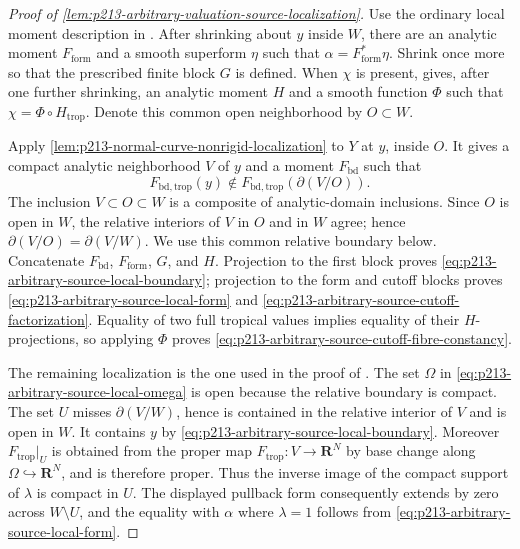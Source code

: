 
\begin{proof}[Proof of
\cref{lem:p213-arbitrary-valuation-source-localization}]
Use the ordinary local moment description in
\cite[Proposition~15.1.1(b)]{CLD25}.  After shrinking about $y$ inside
$W$,
there are an analytic moment $F_{\mathrm{form}}$ and a smooth superform
$\eta$ such that $\alpha=F_{\mathrm{form}}^*\eta$.  Shrink once more so
that the prescribed finite block $G$ is defined.  When $\chi$ is present,
\cite[Corollary~15.1.2]{CLD25} gives, after one further shrinking, an
analytic moment $H$ and a smooth function $\Phi$ such that
$\chi=\Phi\circ H_{\mathrm{trop}}$.  Denote this common open neighborhood
by $O\subset W$.

Apply \cref{lem:p213-normal-curve-nonrigid-localization} to $Y$ at $y$,
inside $O$.  It gives a compact analytic neighborhood $V$ of $y$ and
a moment $F_{\mathrm{bd}}$ such that
\[
 F_{\mathrm{bd,trop}}(y)\notin
 F_{\mathrm{bd,trop}}(\partial(V/O)).
\]
The inclusion $V\subset O\subset W$ is a composite of analytic-domain
inclusions.  Since $O$ is open in $W$, the relative interiors of $V$ in
$O$ and in $W$ agree; hence
$\partial(V/O)=\partial(V/W)$.  We use this common relative boundary
below.
Concatenate $F_{\mathrm{bd}}$, $F_{\mathrm{form}}$, $G$, and $H$.
Projection to the first block proves
\eqref{eq:p213-arbitrary-source-local-boundary}; projection to the form
and cutoff blocks proves
\eqref{eq:p213-arbitrary-source-local-form} and
\eqref{eq:p213-arbitrary-source-cutoff-factorization}.  Equality of two
full tropical values implies equality of their $H$-projections, so
applying $\Phi$ proves
\eqref{eq:p213-arbitrary-source-cutoff-fibre-constancy}.

The remaining localization is the one used in the proof of
\cite[Theorem~16.8.5]{CLD25}.  The set $\Omega$ in
\eqref{eq:p213-arbitrary-source-local-omega} is open because the relative
boundary is compact.  The set $U$ misses $\partial(V/W)$, hence is
contained in the relative interior of $V$ and is open in $W$.  It contains
$y$ by \eqref{eq:p213-arbitrary-source-local-boundary}.  Moreover
$F_{\mathrm{trop}}|_U$ is obtained from the proper map
$F_{\mathrm{trop}}:V\to\mathbf R^N$ by base change along
$\Omega\hookrightarrow\mathbf R^N$, and is therefore proper.  Thus the
inverse image of the compact support of $\lambda$ is compact in $U$.
The displayed pullback form consequently extends by zero across
$W\setminus U$, and the equality with $\alpha$ where $\lambda=1$ follows
from \eqref{eq:p213-arbitrary-source-local-form}.


\end{proof}
